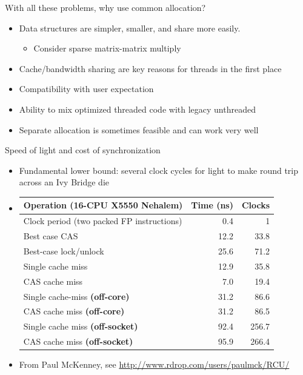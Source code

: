 \documentclass{beamer}
\begin{document}
\begin{frame}{With all these problems, why use common allocation?}
  \begin{itemize}
  \item Data structures are simpler, smaller, and share more easily.
    \begin{itemize}
    \item Consider sparse matrix-matrix multiply
    \end{itemize}
  \item Cache/bandwidth sharing are key reasons for threads in the first place
  \item Compatibility with user expectation
  \item Ability to mix optimized threaded code with legacy unthreaded
  \item Separate allocation is sometimes feasible and can work very well
  \end{itemize}
\end{frame}

\begin{frame}{Speed of light and cost of synchronization}
  \begin{itemize}
  \item Fundamental lower bound: several clock cycles for light to make round trip across an Ivy Bridge die
  \item 
    \begin{tabular}{lrr}
      \toprule
      Operation (16-CPU X5550 Nehalem) & Time (ns) & Clocks \\
      \midrule
      Clock period (two packed FP instructions) & 0.4 & 1 \\
      Best case CAS & 12.2 & 33.8 \\
      Best-case lock/unlock & 25.6 & 71.2 \\
      Single cache miss & 12.9 & 35.8 \\
      CAS cache miss & 7.0 & 19.4 \\
      Single cache-miss {\bf(off-core)} & 31.2 & 86.6 \\
      CAS cache miss {\bf (off-core)} & 31.2 & 86.5 \\
      Single cache miss {\bf (off-socket)} & 92.4 & 256.7 \\
      CAS cache miss {\bf (off-socket)} & 95.9 & 266.4 \\
      \bottomrule
    \end{tabular}
  \item From Paul McKenney, see \url{http://www.rdrop.com/users/paulmck/RCU/}
  \end{itemize}
\end{frame}
\end{document}
